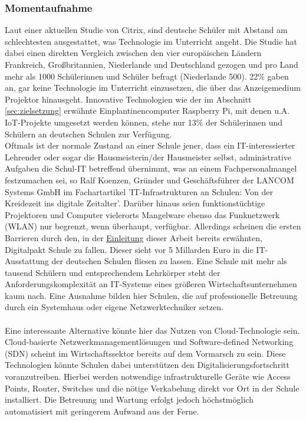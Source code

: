 \subsubsection{Momentaufnahme}\label{sec:technikunterricht}
Laut einer aktuellen Studie von Citrix, sind deutsche Schüler mit Abstand am schlechtesten 
ausgestattet, was Technologie im Unterricht angeht\cite{Technisc27:online}. Die Studie hat dabei einen direkten Vergleich zwischen den vier europäischen Ländern Frankreich, Großbritannien, Niederlande und Deutschland gezogen und pro Land mehr als 1000 Schülerinnen und Schüler befragt (Niederlande 500). 22\% gaben an, gar keine Technologie im Unterricht einzusetzen, die über das Anzeigemedium Projektor hinausgeht. Innovative Technologien wie der im Abschnitt \ref{sec:zielsetzung} erwähnte Einplantinencomputer Raspberry Pi, mit denen u.A. IoT-Projekte umgesetzt werden können, stehe nur 13\% der Schülerinnen und Schülern an deutschen Schulen zur Verfügung. \\ 
Oftmals ist der normale Zustand an einer Schule jener, dass ein IT-interessierter Lehrender oder sogar die Hausmeisterin/der Hausmeister selbst, administrative Aufgaben die Schul-IT betreffend übernimmt, was an einem Fachpersonalmangel festzumachen sei, so Ralf Koenzen, Gründer und Geschäftsführer der LANCOM Systems GmbH im Fachartartikel 'IT-Infrastrukturen an Schulen: Von der Kreidezeit ins digitale Zeitalter'\cite{Koenzen2018}. Darüber hinaus seien funktionstüchtige Projektoren und Computer vielerorts Mangelware ebenso das Funknetzwerk (WLAN) nur begrenzt, wenn überhaupt, verfügbar. Allerdings scheinen die ersten Barrieren durch den, in der  \hyperref[sec:einleitung]{Einleitung} dieser Arbeit bereits erwähnten, Digitalpakt Schule zu fallen. Dieser sieht vor 5 Millarden Euro in die IT-Ausstattung der deutschen Schulen fliesen zu lassen. Eine Schule mit mehr als tausend Schülern und entsprechendem Lehrkörper steht der Anforderungskomplexität an IT-Systeme eines größeren Wirtschaftsunternehmen kaum nach. Eine Ausnahme bilden hier Schulen, die auf professionelle Betreuung durch ein Systemhaus oder eigene Netzwerktechniker setzen\cite{Koenzen2018}. \\ \\ Eine interessante Alternative könnte hier das Nutzen von Cloud-Technologie sein. Cloud-basierte Netzwerkmanagementlösungen und Software-defined Networking (SDN) scheint im Wirtschaftssektor bereits auf dem Vormarsch zu sein. Diese Technologien könnte Schulen dabei unterstützen den Digitalisierungsfortschritt voranzutreiben. Hierbei werden notwendige infrastrukturelle Geräte wie Access Points, Router, Switches und die nötige Verkabelung direkt vor Ort in der Schule installiert. Die Betreuung und Wartung erfolgt jedoch höchstmöglich automatisiert mit geringerem Aufwand aus der Ferne. 

